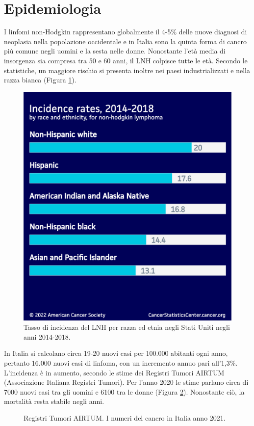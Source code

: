 \section{Epidemiologia}
I linfomi non-Hodgkin rappresentano globalmente il 4-5\% delle nuove diagnosi di neoplasia nella popolazione 
occidentale e in Italia sono la quinta forma di cancro più comune negli uomini e la sesta nelle donne\cite{AIOM}. 
Nonostante l’età media di insorgenza sia compresa tra 50 e 60 anni, il LNH colpisce tutte le età.
Secondo le statistiche, un maggiore rischio si presenta inoltre nei paesi industrializzati e nella razza 
bianca (Figura \ref{fig:FIGURE_2.2})\cite{AMERICANCS}.

\begin{figure}[H]
    \begin{center}
    \includegraphics[width=0.3\columnwidth]{img/Incidencerates2014-18race-ethnicity.png}
    \vspace{-3mm}
    \end{center}
    \caption{Tasso di incidenza del LNH per razza ed etnia negli Stati Uniti negli anni 2014-2018.
    \cite{Americanstatistic}}
    \label{fig:FIGURE_2.2}
\end{figure}

In Italia si calcolano circa 19-20 nuovi casi per 100.000 abitanti ogni anno, pertanto 16.000 nuovi casi di linfoma, 
con un incremento annuo pari all’1,3\%\cite{AIOM}.\\
L’incidenza è in aumento, secondo le stime dei Registri Tumori AIRTUM (Associazione Italiana Registri Tumori).
Per l’anno 2020 le stime parlano circa di 7000 nuovi casi tra gli uomini e 6100 tra le donne (Figura \ref{fig:FIGURE_2.3}). 
Nonostante ciò, la mortalità resta stabile negli anni\cite{AIRC}.

\begin{figure}[H]
    \begin{center}
    \vspace{-3mm}
    \end{center}
    \caption{Registri Tumori AIRTUM. I numeri del cancro in Italia anno 2021.
    \cite{img4-6-7}}
    \label{fig:FIGURE_2.3}
\end{figure}

